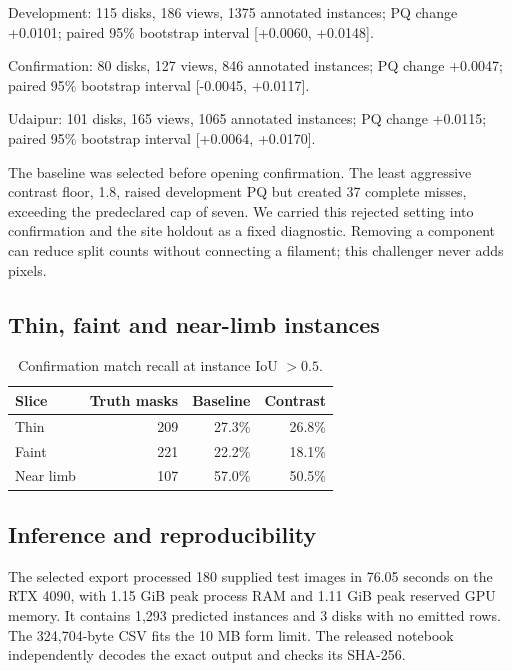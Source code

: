 Development: 115 disks, 186 views, 1375 annotated instances; PQ change +0.0101; paired 95\% bootstrap interval [+0.0060, +0.0148].

Confirmation: 80 disks, 127 views, 846 annotated instances; PQ change +0.0047; paired 95\% bootstrap interval [-0.0045, +0.0117].

Udaipur: 101 disks, 165 views, 1065 annotated instances; PQ change +0.0115; paired 95\% bootstrap interval [+0.0064, +0.0170].

\par\smallskip

The baseline was selected before opening confirmation. The least aggressive contrast floor, 1.8, raised development PQ but created 37 complete misses, exceeding the predeclared cap of seven. We carried this rejected setting into confirmation and the site holdout as a fixed diagnostic. Removing a component can reduce split counts without connecting a filament; this challenger never adds pixels.

\subsection{Thin, faint and near-limb instances}

\begin{table}[h]\centering\small

\caption{Confirmation match recall at instance IoU \(>0.5\).}

\begin{tabular}{lrrr}

\toprule

Slice & Truth masks & Baseline & Contrast\\

\midrule

Thin & 209 & 27.3\% & 26.8\%\\

Faint & 221 & 22.2\% & 18.1\%\\

Near limb & 107 & 57.0\% & 50.5\%\\

\bottomrule

\end{tabular}

\end{table}



\subsection{Inference and reproducibility}

The selected export processed 180 supplied test images in 76.05 seconds on the RTX 4090, with 1.15 GiB peak process RAM and 1.11 GiB peak reserved GPU memory. It contains 1,293 predicted instances and 3 disks with no emitted rows. The 324,704-byte CSV fits the 10 MB form limit. The released notebook independently decodes the exact output and checks its SHA-256.


